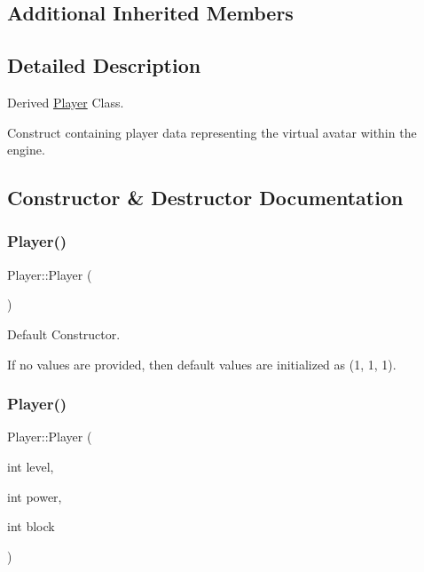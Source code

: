\subsection*{Additional Inherited Members}


\subsection{Detailed Description}
Derived \mbox{\hyperlink{classPlayer}{Player}} Class. 

Construct containing player data representing the virtual avatar within the engine. 

\subsection{Constructor \& Destructor Documentation}
\mbox{\label{classPlayer_affe0cc3cb714f6deb4e62f0c0d3f1fd8}} 
\subsubsection{\texorpdfstring{Player()}{Player()}\hspace{0.1cm}{\footnotesize\ttfamily [1/3]}}
{\footnotesize\ttfamily Player\+::\+Player (\begin{DoxyParamCaption}{ }\end{DoxyParamCaption})}



Default Constructor. 

If no values are provided, then default values are initialized as (1, 1, 1). \mbox{\label{classPlayer_a47eaddc652e72e30707a8647364fc734}} 
\subsubsection{\texorpdfstring{Player()}{Player()}\hspace{0.1cm}{\footnotesize\ttfamily [2/3]}}
{\footnotesize\ttfamily Player\+::\+Player (\begin{DoxyParamCaption}\item[{int}]{level,  }\item[{int}]{power,  }\item[{int}]{block }\end{DoxyParamCaption})}



